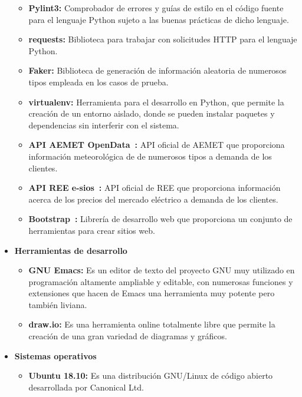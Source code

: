 \begin{itemize}
\begin{itemize}
  \item \textbf{Pylint3:} Comprobador de errores y guías de estilo en el código fuente para el lenguaje Python sujeto a las buenas prácticas de dicho lenguaje.
  \item \textbf{requests:} Biblioteca para trabajar con solicitudes HTTP para el lenguaje Python.
  \item \textbf{Faker:} Biblioteca de generación de información aleatoria de numerosos tipos empleada en los casos de prueba.
  \item \textbf{virtualenv: } Herramienta para el desarrollo en Python, que permite la creación de un entorno aislado, donde se pueden instalar paquetes y dependencias sin interferir con el sistema.
  \item \textbf{API AEMET OpenData~\cite{Aemet}:} \gls{API} oficial de \gls{AEMET} que proporciona información meteorológica de de numerosos tipos a demanda de los clientes.
  \item \textbf{API REE e-sios~\cite{Ree}:} \gls{API} oficial de \gls{REE} que proporciona información acerca de los precios del mercado eléctrico a demanda de los clientes.
  \item \textbf{Bootstrap~\cite{Boots}:} Librería de desarrollo web que proporciona un conjunto de herramientas para crear sitios web.
  \end{itemize}
\item \textbf{Herramientas de desarrollo}
  \begin{itemize}
  \item \textbf{GNU Emacs:} Es un editor de texto del proyecto GNU muy utilizado en programación altamente ampliable y editable, con numerosas funciones y extensiones que hacen de Emacs una herramienta muy potente pero también liviana.
  \item \textbf{draw.io:} Es una herramienta online totalmente libre que permite la creación de una gran variedad de diagramas y gráficos.
  \end{itemize}
\item \textbf{Sistemas operativos}
  \begin{itemize}
  \item \textbf{Ubuntu 18.10:} Es una distribución GNU/Linux de código abierto desarrollada por Canonical Ltd.
  \end{itemize}
\end{itemize}
